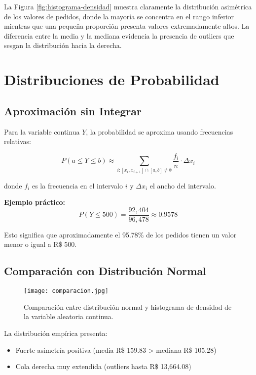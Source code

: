 \documentclass[12pt,a4paper,twoside]{article}
\begin{document}
La Figura \ref{fig:histograma-densidad} muestra claramente la distribución asimétrica de los valores de pedidos, donde la mayoría se concentra en el rango inferior mientras que una pequeña proporción presenta valores extremadamente altos. La diferencia entre la media y la mediana evidencia la presencia de outliers que sesgan la distribución hacia la derecha.

\section{Distribuciones de Probabilidad}

\subsection{Aproximación sin Integrar}
Para la variable continua $Y$, la probabilidad se aproxima usando frecuencias relativas:

$$P(a \leq Y \leq b) \approx \sum_{i: [x_i, x_{i+1}] \cap [a,b] \neq \emptyset} \frac{f_i}{n} \cdot \Delta x_i$$

donde $f_i$ es la frecuencia en el intervalo $i$ y $\Delta x_i$ el ancho del intervalo.

\textbf{Ejemplo práctico:} 
$$P(Y \leq 500) = \frac{92,404}{96,478} \approx 0.9578$$

Esto significa que aproximadamente el 95.78\% de los pedidos tienen un valor menor o igual a R\$ 500.

\subsection{Comparación con Distribución Normal}
\begin{figure}[H]
\centering
\texttt{[image: comparacion.jpg]}
\caption{Comparación entre distribución normal y histograma de densidad de la variable aleatoria continua.}
\label{fig:comparacion}
\end{figure}
La distribución empírica presenta:
\begin{itemize}
    \item Fuerte asimetría positiva (media R\$ 159.83 > mediana R\$ 105.28)
    \item Cola derecha muy extendida (outliers hasta R\$ 13,664.08)
\end{itemize}

\newpage
\end{document}
